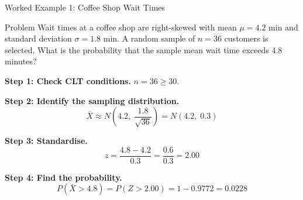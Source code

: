 \documentclass[aspectratio=169]{beamer}
\begin{document}
\begin{frame}{Worked Example 1: Coffee Shop Wait Times}
    \begin{exampleblock}{Problem}
        Wait times at a coffee shop are right-skewed with mean $\mu = 4.2$ min and
        standard deviation $\sigma = 1.8$ min.  A random sample of $n = 36$ customers
        is selected.  What is the probability that the sample mean wait time exceeds
        4.8 minutes?
    \end{exampleblock}

    \textbf{Step 1: Check CLT conditions.}
    $n = 36 \geq 30$. \checkmark

    \textbf{Step 2: Identify the sampling distribution.}
    \[
        \bar{X} \approx N\!\left(4.2,\; \frac{1.8}{\sqrt{36}}\right) = N(4.2,\; 0.3)
    \]

    \textbf{Step 3: Standardise.}
    \[
        z = \frac{4.8 - 4.2}{0.3} = \frac{0.6}{0.3} = 2.00
    \]

    \textbf{Step 4: Find the probability.}
    \[
        P(\bar{X} > 4.8) = P(Z > 2.00) = 1 - 0.9772 = \mathbf{0.0228}
    \]
\end{frame}
\end{document}
